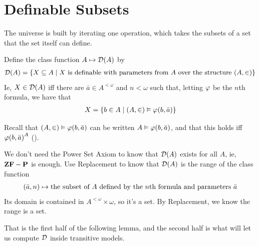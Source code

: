 \section{Definable Subsets}

The universe is built by iterating one operation, which takes the subsets of a set that the set itself can define.

\begin{boxdefinition}
    Define the class function $A \mapsto \mathcal{D}(A)$ by
    \begin{align*}
        \mathcal{D}(A) = \left\{ X \subseteq A \; \middle\vert \; X \text{ is definable with parameters from $A$ over the structure $(A, \in)$} \right\}
    \end{align*}
    Ie, $X \in \mathcal{D}(A)$ iff there are $\bar{a} \in A^{<\omega}$ and $n < \omega$ such that, letting $\varphi$ be the $n$th formula, we have that
    \begin{align*}
        X = \left\{ b \in A \; \middle\vert \; (A, \in) \vDash \varphi\!\left( b, \bar{a} \right) \right\}
    \end{align*}
\end{boxdefinition}

Recall that $(A, \in) \vDash \varphi\!\left( b, \bar{a} \right)$ can be written $A \vDash \varphi\!\left( b, \bar{a} \right)$, and that this holds iff $\varphi\!\left( b, \bar{a} \right)^A$ ().

We don't need the Power Set Axiom to know that $\mathcal{D}(A)$ exists for all $A$, ie, $\mathbf{ZF} - \mathbf{P}$ is enough. Use Replacement to know that $\mathcal{D}(A)$ is the range of the class function
\begin{align*}
    \left( \bar{a}, n \right) \mapsto \text{the subset of $A$ defined by the $n$th formula and parameters $\bar{a}$}
\end{align*}
Its domain is contained in $A^{<\omega} \times \omega$, so it's a set. By Replacement, we know the range is a set.

That is the first half of the following lemma, and the second half is what will let us compute $\mathcal{D}$ inside transitive models.

